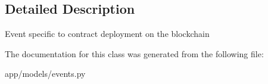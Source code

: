 \subsection{Detailed Description}
\begin{DoxyVerb}Event specific to contract deployment on the blockchain
\end{DoxyVerb}
 

The documentation for this class was generated from the following file\+:\begin{DoxyCompactItemize}
\item 
app/models/events.\+py\end{DoxyCompactItemize}
